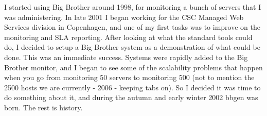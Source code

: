  I started using Big Brother around 1998, for monitoring a bunch of servers that I was administering. In late 2001 I began working for the CSC Managed Web Services division in Copenhagen, and one of my first tasks was to improve on the monitoring and SLA reporting. After looking at what the standard tools could do, I decided to setup a Big Brother system as a demonstration of what could be done. This was an immediate success. Systems were rapidly added to the Big Brother monitor, and I began to see some of the scalability problems that happen when you go from monitoring 50 servers to monitoring 500 (not to mention the 2500 hosts we are currently - 2006 - keeping tabs on). So I decided it was time to do something about it, and during the autumn and early winter 2002 bbgen was born. The rest is history.

